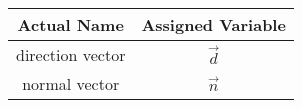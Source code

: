 \begin{tabular}[12pt]{ |c| c|}
    \hline
    \textbf{Actual Name} & \textbf{Assigned Variable}\\ 
    \hline
    direction vector & $\vec{d}$ \\
    \hline
    normal vector & $\vec{n}$ \\
    \hline
    \end{tabular}

